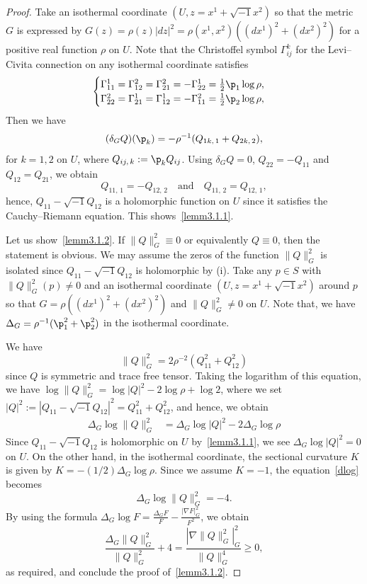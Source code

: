  
\begin{proof}
Take an isothermal coordinate $(U, z=x^1+\sqrt{-1}x^2)$ so that the metric $G$ is expressed by $G(z)=\rho(z)|dz|^2=\rho(x^1, x^2)((dx^1)^2+(dx^2)^2)$ for a positive real function $\rho$ on $U$. Note that the Christoffel symbol $\Gamma_{ij}^k$ for the Levi--Civita connection on any isothermal coordinate satisfies
\begin{align*}
\begin{cases}
\Gamma_{11}^1=\Gamma_{12}^2=\Gamma_{21}^2=-\Gamma_{22}^1=\frac{1}{2}\p_1\log {\rho},\\
\Gamma_{22}^2=\Gamma_{21}^1=\Gamma_{12}^1=-\Gamma_{11}^2=\frac{1}{2}\p_2\log{\rho},\\
\end{cases}
\end{align*}
Then we have
\begin{align*}
(\delta_{G}Q)(\p_k)=-\rho^{-1}(Q_{1k,\,1}+Q_{2k,\,2}),
\end{align*}
for $k=1,2$ on $U$, where $Q_{ij,\,k}:=\p_kQ_{ij}$. Using $\delta_{G}Q=0$, $Q_{22}=-Q_{11}$ and $Q_{12}=Q_{21}$, we obtain
\[
Q_{11,\,1}=-Q_{12,\,2}\quad \text{and}\quad Q_{11,\,2}=Q_{12,\,1},
\]
hence, $Q_{11}-\sqrt{-1}Q_{12}$ is a holomorphic function on $U$ since it satisfies the Cauchy--Riemann equation. This shows~\eqref{lemm3.1.1}.


Let us show~\eqref{lemm3.1.2}. If $\|Q\|_G^2\equiv 0$ or equivalently $Q\equiv 0$, then the statement is obvious. We may assume the zeros of the function $\|Q\|_G^2$ is isolated since $Q_{11}-\sqrt{-1}Q_{12}$ is holomorphic by (i). Take any $p\in S$ with $\|Q\|_G^2(p)\neq 0$ and an isothermal coordinate $(U, z=x^1+\sqrt{-1} x^2)$ around $p$ so that $G=\rho((dx^1)^2+(dx^2)^2)$ and $\|Q\|_G^2\neq 0$ on $U$. Note that, we have $\Delta_G=\rho^{-1}(\p_1^2+\p_2^2)$ in the isothermal coordinate.

We have
\[
\|Q\|_G^2=2\rho^{-2}\left(Q_{11}^2+Q_{12}^2\right)
\]
since $Q$ is symmetric and trace free tensor. Taking the logarithm of this equation, we have $\log\|Q\|_G^2=\log|Q|^2-2\log\rho+\log2$, where we set $|Q|^2:=|Q_{11}-\sqrt{-1}Q_{12}|^2=Q_{11}^2+Q_{12}^2$, and hence, we obtain
\begin{align}\label{dlog}
\Delta_G\log\|Q\|_G^2&=\Delta_{G}\log|Q|^2-2\Delta_G\log\rho
\end{align}
Since $Q_{11}-\sqrt{-1}Q_{12}$ is holomorphic on $U$ by~\eqref{lemm3.1.1}, we see $\Delta_{G}\log|Q|^2=0$ on $U$. On the other hand, in the isothermal coordinate, the sectional curvature $K$ is given by $K=-(1/2)\Delta_G\log \rho$. Since we assume $K=-1$, the equation~\eqref{dlog} becomes
\[
\Delta_G\log\|Q\|_G^2=-4.
\]
By using the formula $\Delta_G\log F=\tfrac{\Delta_G F}{F}-\tfrac{|\nabla F|_G^2}{F^2}$, we obtain
\[
\frac{\Delta_G\|Q\|_G^2}{\|Q\|_G^2}+4=\frac{|\nabla \|Q\|_G^2|_G^2}{\|Q\|_G^4}\geq 0,
\]
as required, and conclude the proof of~\eqref{lemm3.1.2}.
\end{proof}


